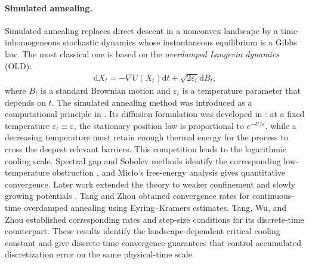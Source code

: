 \documentclass[11pt]{article}
\theoremstyle{definition}
\newcommand{\dd}{\mathrm d}
\newcommand{\eps}{\varepsilon}
\begin{document}
\paragraph{Simulated annealing.}
Simulated annealing replaces direct descent in a nonconvex landscape by a
time-inhomogeneous stochastic dynamics whose instantaneous equilibrium is a Gibbs
law. The most classical one is based on the \textit{overdamped Langevin dynamics} (OLD): 
\begin{align}\label{eqn:OLD}
\dd X_{t}=-\nabla U(X_{t})\dd t+\sqrt{2\varepsilon_{t}}\dd B_{t},
\end{align}
where $B_{t}$ is a standard Brownian motion and $\varepsilon_{t}$ is a temperature parameter
that depends on $t$.
The simulated annealing method was introduced as a computational principle in
\cite{KirkpatrickGelattVecchi1983}. Its diffusion formulation was developed in
\cite{GemanHwang1986,ChiangHwangSheu1987,Royer1989}: at a fixed temperature
$\eps_{t}\equiv\eps$, the stationary position law is proportional to $e^{-U/\eps}$, while a decreasing
temperature must retain enough thermal energy for the process to cross the deepest
relevant barriers. This competition leads to the logarithmic cooling scale. Spectral
gap and Sobolev methods identify the corresponding low-temperature obstruction
\cite{HolleyStroock1988,HolleyKusuokaStroock1989}, and Miclo's free-energy analysis
\cite{Miclo1992} gives quantitative convergence. Later work extended the theory to
weaker confinement and slowly growing potentials
\cite{Zitt2008,FournierTardif2021}. Tang and Zhou \cite{TangZhou2023} obtained
convergence rates for continuous-time overdamped annealing using
Eyring--Kramers estimates. Tang, Wu, and Zhou \cite{TangWuZhou2024} established
corresponding rates and step-size conditions for its discrete-time counterpart.
These results identify the landscape-dependent critical cooling constant and
give discrete-time convergence guarantees that control accumulated
discretization error on the same physical-time scale.
\end{document}
